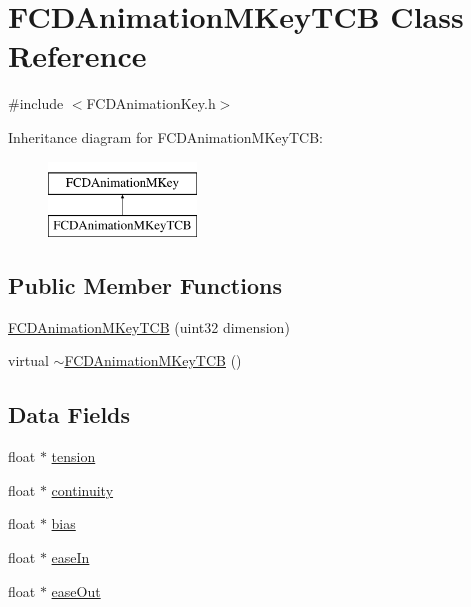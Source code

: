 \hypertarget{classFCDAnimationMKeyTCB}{
\section{FCDAnimationMKeyTCB Class Reference}
\label{classFCDAnimationMKeyTCB}
}


{\ttfamily \#include $<$FCDAnimationKey.h$>$}

Inheritance diagram for FCDAnimationMKeyTCB:\begin{figure}[H]
\begin{center}
\leavevmode
\includegraphics[height=2.000000cm]{classFCDAnimationMKeyTCB}
\end{center}
\end{figure}
\subsection*{Public Member Functions}
\begin{DoxyCompactItemize}
\item 
\hyperlink{classFCDAnimationMKeyTCB_aeeee3d548cbe6c41cd9a46ff0079d05d}{FCDAnimationMKeyTCB} (uint32 dimension)
\item 
virtual \hyperlink{classFCDAnimationMKeyTCB_a515f7219e82e55db7a7d543c624207c2}{$\sim$FCDAnimationMKeyTCB} ()
\end{DoxyCompactItemize}
\subsection*{Data Fields}
\begin{DoxyCompactItemize}
\item 
float $\ast$ \hyperlink{classFCDAnimationMKeyTCB_a05aa82c6e377a34c8d4c521f05739070}{tension}
\item 
float $\ast$ \hyperlink{classFCDAnimationMKeyTCB_aad952e9ad96796b79ffbd7ea15fa4ce7}{continuity}
\item 
float $\ast$ \hyperlink{classFCDAnimationMKeyTCB_ae3812b7c36b879e9fd9ecfe67120c219}{bias}
\item 
float $\ast$ \hyperlink{classFCDAnimationMKeyTCB_a7e35030931711b58ae099eee73d05102}{easeIn}
\item 
float $\ast$ \hyperlink{classFCDAnimationMKeyTCB_a9cea41d40b917bc3f5151320318c49fe}{easeOut}
\end{DoxyCompactItemize}


